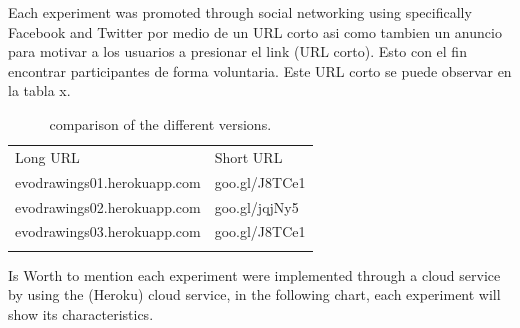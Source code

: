 Each experiment was promoted through social networking using specifically Facebook and  Twitter por medio de un URL corto asi como tambien un anuncio para motivar a los usuarios a presionar el link (URL corto). Esto con el fin encontrar participantes de forma voluntaria. Este URL corto se puede observar en la tabla x.

\begin{table}
	\small
	\caption{comparison of the different versions.}
	\label{tab:shorurl} 
	\centering
	\small
	\begin{tabular}{p{6cm} p{4cm}  }
		\hline\noalign{\smallskip}
		Long URL & Short URL  \\
		\noalign{\smallskip}\hline\noalign{\smallskip}
		\small{evodrawings01.herokuapp.com} & \small{goo.gl/J8TCe1}\\ \hline
		\small{evodrawings02.herokuapp.com} & \small{goo.gl/jqjNy5}\\ \hline
		\small{evodrawings03.herokuapp.com} & \small{goo.gl/J8TCe1}\\ \hline
		\noalign{\smallskip}\hline
	\end{tabular}
\end{table}

Is Worth to mention each experiment were implemented through a cloud service by using the  (Heroku) cloud service, in the following chart, each experiment will show its characteristics.

